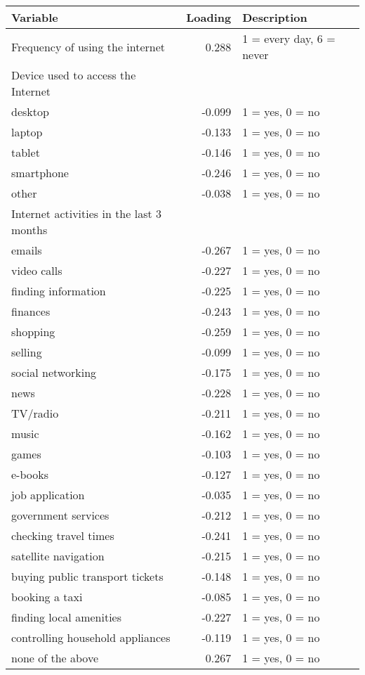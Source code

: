 \documentclass[11pt]{article}
\begin{document}
    \begin{tabular}{lrl}
        \toprule
        Variable & Loading & Description \\
        \midrule
        Frequency of using the internet & 0.288 & 1 = every day, 6 = never \\
        Device used to access the Internet & & \\
        desktop & -0.099 & 1 = yes, 0 = no \\
        laptop & -0.133 & 1 = yes, 0 = no \\
        tablet & -0.146 & 1 = yes, 0 = no \\
        smartphone & -0.246 & 1 = yes, 0 = no \\
        other & -0.038 & 1 = yes, 0 = no \\
        Internet activities in the last 3 months & & \\
        emails & -0.267 & 1 = yes, 0 = no \\
        video calls & -0.227 & 1 = yes, 0 = no \\
        finding information & -0.225 & 1 = yes, 0 = no \\
        finances & -0.243 & 1 = yes, 0 = no \\
        shopping & -0.259 & 1 = yes, 0 = no \\
        selling & -0.099 & 1 = yes, 0 = no \\
        social networking & -0.175 & 1 = yes, 0 = no \\
        news & -0.228 & 1 = yes, 0 = no \\
        TV/radio & -0.211 & 1 = yes, 0 = no \\
        music & -0.162 & 1 = yes, 0 = no \\
        games & -0.103 & 1 = yes, 0 = no \\
        e-books & -0.127 & 1 = yes, 0 = no \\
        job application & -0.035 & 1 = yes, 0 = no \\
        government services & -0.212 & 1 = yes, 0 = no \\
        checking travel times & -0.241 & 1 = yes, 0 = no \\
        satellite navigation & -0.215 & 1 = yes, 0 = no \\
        buying public transport tickets & -0.148 & 1 = yes, 0 = no \\
        booking a taxi & -0.085 & 1 = yes, 0 = no \\
        finding local amenities & -0.227 & 1 = yes, 0 = no \\
        controlling household appliances & -0.119 & 1 = yes, 0 = no \\
        none of the above & 0.267 & 1 = yes, 0 = no \\
        \bottomrule
    \end{tabular}
\end{document}
